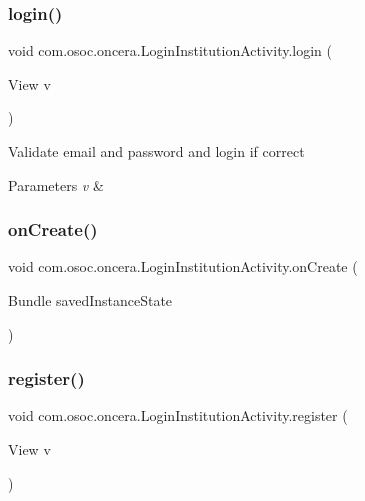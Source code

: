 \subsubsection{\texorpdfstring{login()}{login()}}
{\footnotesize\ttfamily void com.\+osoc.\+oncera.\+Login\+Institution\+Activity.\+login (\begin{DoxyParamCaption}\item[{View}]{v }\end{DoxyParamCaption})}

Validate email and password and login if correct 
\begin{DoxyParams}{Parameters}
{\em v} & \\
\hline
\end{DoxyParams}
\mbox{\label{classcom_1_1osoc_1_1oncera_1_1_login_institution_activity_a66a57b5da46c93ec42702ba2f2e4b2b1}} 
\subsubsection{\texorpdfstring{onCreate()}{onCreate()}}
{\footnotesize\ttfamily void com.\+osoc.\+oncera.\+Login\+Institution\+Activity.\+on\+Create (\begin{DoxyParamCaption}\item[{Bundle}]{saved\+Instance\+State }\end{DoxyParamCaption})\hspace{0.3cm}{\ttfamily [protected]}}

\mbox{\label{classcom_1_1osoc_1_1oncera_1_1_login_institution_activity_a5ace1b5572af28cd76e4b094a240f7be}} 
\subsubsection{\texorpdfstring{register()}{register()}}
{\footnotesize\ttfamily void com.\+osoc.\+oncera.\+Login\+Institution\+Activity.\+register (\begin{DoxyParamCaption}\item[{View}]{v }\end{DoxyParamCaption})}

